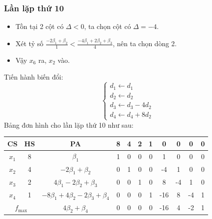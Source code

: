 \documentclass[12pt]{article}
\begin{document}
\subsubsection{Lần lặp thứ 10}
\begin{itemize}
\item Tồn tại 2 cột có $\Delta < 0$, ta chọn cột có $\Delta = -4$.
\item Xét tỷ số $\displaystyle \frac{-2\beta_1 + \beta_2}{1} < \frac{-4\beta_1 + 2\beta_2 + \beta_3}{4}$, nên ta chọn dòng 2.
\item Vậy $x_6$ ra, $x_2$ vào.
\end{itemize}
Tiến hành biến đổi:
$$
\left\{
\begin{array}{lll}
d_1 \leftarrow d_1 \\
d_2 \leftarrow d_2\\
d_3 \leftarrow d_3 - 4d_2\\
d_4 \leftarrow d_4 + 8d_2
\end{array}
\right.
$$
Bảng đơn hình cho lần lặp thứ 10 như sau:
\begin{table}[H]
\centering
\begin{tabular}{|c|c|c|c|c|c|c|c|c|c|c|}
\hline
CS & HS & PA & 8 & 4 & 2 & 1 & 0 & 0 & 0 & 0 \\
\hline
$x_1$ & 8 & $\beta_1$ & 1 & 0 & 0 & 0 & 1 & 0 & 0 & 0 \\
$x_2$ & 4 & $-2\beta_1 + \beta_2$ & 0 & 1 & 0 & 0 & -4 & 1 & 0 & 0 \\
$x_3$ & 2 & $4\beta_1 - 2\beta_2 + \beta_3$ & 0 & 0 & 1 & 0 & 8 & -4 & 1 & 0 \\
$x_4$ & 1 & $-8\beta_1 + 4\beta_2 - 2\beta_3 + \beta_4$ & 0 & 0 & 0 & 1 & -16 & 8 & -4 & 1 \\
\hline
\multicolumn{2}{|c|}{$f_{\max}$}
& $4\beta_2 + \beta_4$ & 0 & 0 & 0 & 0 & -16 & 4 & -2 & 1 \\
\hline
\end{tabular}
\end{table}
\end{document}
